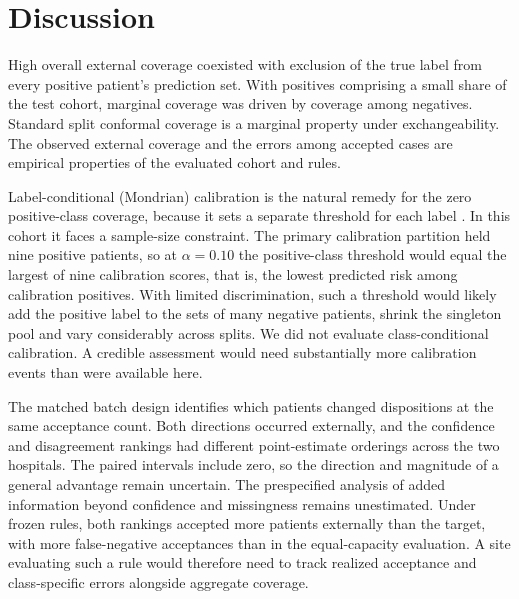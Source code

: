 \section{Discussion}

High overall external coverage coexisted with exclusion of the true label from every positive patient's prediction set. With positives comprising a small share of the test cohort, marginal coverage was driven by coverage among negatives. Standard split conformal coverage is a marginal property under exchangeability. The observed external coverage and the errors among accepted cases are empirical properties of the evaluated cohort and rules.

Label-conditional (Mondrian) calibration is the natural remedy for the zero positive-class coverage, because it sets a separate threshold for each label \cite{vovk2005algorithmic,sadinle2019least}. In this cohort it faces a sample-size constraint. The primary calibration partition held nine positive patients, so at $\alpha=0.10$ the positive-class threshold would equal the largest of nine calibration scores, that is, the lowest predicted risk among calibration positives. With limited discrimination, such a threshold would likely add the positive label to the sets of many negative patients, shrink the singleton pool and vary considerably across splits. We did not evaluate class-conditional calibration. A credible assessment would need substantially more calibration events than were available here.

The matched batch design identifies which patients changed dispositions at the same acceptance count. Both directions occurred externally, and the confidence and disagreement rankings had different point-estimate orderings across the two hospitals. The paired intervals include zero, so the direction and magnitude of a general advantage remain uncertain. The prespecified analysis of added information beyond confidence and missingness remains unestimated. Under frozen rules, both rankings accepted more patients externally than the target, with more false-negative acceptances than in the equal-capacity evaluation. A site evaluating such a rule would therefore need to track realized acceptance and class-specific errors alongside aggregate coverage.

